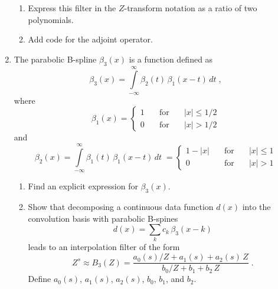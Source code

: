 \begin{enumerate}
\lstset{language=c,numbers=left,numberstyle=\tiny,showstringspaces=false}


\begin{enumerate}
\item Express this filter in the $Z$-transform notation as a ratio
  of two polynomials.
\item Add code for the adjoint operator.
\end{enumerate}

\item The parabolic B-spline $\beta_3(x)$ is a function defined as
 \begin{equation}
   \label{eq:b3} 
   \beta_3(x) = \int\limits_{-\infty}^{\infty} \beta_2(t)\,\beta_1(x-t)\,d t\;,
\end{equation}
where
\begin{equation}
   \label{eq:b1}
   \beta_1(x) = \left\{\begin{array}{lcl} 1 & \quad\mbox{for}\quad & |x| \le 1/2 \\
       0 &\quad \mbox{for}\quad& |x| > 1/2\end{array}\right.
 \end{equation}
and
\begin{equation}
  \label{eq:b2} 
   \beta_2(x) = \int\limits_{-\infty}^{\infty} \beta_1(t)\,\beta_1(x-t)\,d t\;
   = \left\{\begin{array}{lcl} 1-|x| &\quad \mbox{for}\quad& |x| \le 1 \\
       0 & \quad \mbox{for}\quad&  |x| > 1\end{array}\right.
\end{equation}

\begin{enumerate}
\item Find an explicit expression for $\beta_3(x)$.
\item Show that decomposing a continuous data function $d(x)$ into the convolution basis 
  with parabolic B-spines
  \begin{equation}
    \label{eq:basis} 
    d(x) = \sum\limits_k c_k\,\beta_3(x-k)
  \end{equation}
  leads to an interpolation filter of the form
  \begin{equation}
    \label{eq:bz}
    Z^s \approx B_3(Z) = \frac{a_0(s)/Z + a_1(s) + a_2(s)\,Z}{b_0/Z + b_1 + b_2\,Z}\;.
  \end{equation}
  Define $a_0(s)$, $a_1(s)$, $a_2(s)$, $b_0$, $b_1$, and $b_2$.
\end{enumerate}

\end{enumerate}

